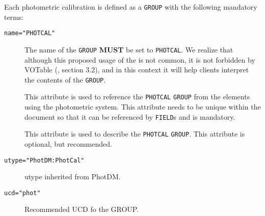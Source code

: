 \documentclass[11pt,a4paper]{ivoa} 
\newcommand\ada[1]{\textcolor{blue}{\textbf{#1}}}
\let\fg=\color
\def\elem#1{{\tt{\fg{DarkRed}#1}}}
\def\attrval#1#2{{\tt{\fg{DarkRed}#1}="{\fg{DarkPurple}#2}"}}
\begin{document}
Each photometric calibration is defined as a \elem{GROUP} with the
following mandatory terms:
\begin{description}
     \item[\attrval{name}{PHOTCAL}] The name of the \elem{GROUP}
       \textbf{MUST} be set to \verb|PHOTCAL|. We realize that
       although this proposed usage of the  is not common,
       it is not forbidden by VOTable (\citet{2019ivoa.spec.1021O},
       section 3.2), and in this context it will help clients
       interpret the contents of the \elem{GROUP}.
     \item[] This attribute is used to reference the
       \texttt{PHOTCAL} \elem{GROUP} from the elements using the
       photometric system. This attribute needs to be unique within
       the document so that it can be referenced by \elem{FIELD}s and
       is mandatory.
     \item[] This attribute is used to describe the
       \texttt{PHOTCAL} \elem{GROUP}. This attribute is optional, but
       recommended.
     \item[\attrval{utype}{PhotDM:PhotCal}] utype inherited from PhotDM.
     \item[\attrval{ucd}{phot}] Recommended UCD fo the GROUP.
\end{description}
\end{document}
